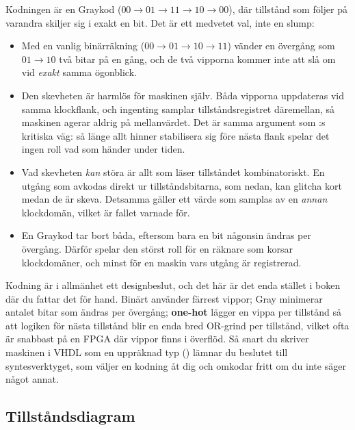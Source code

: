 Kodningen är en Graykod ($00 \to 01 \to 11 \to 10 \to 00$), där tillstånd som följer på varandra
skiljer sig i exakt en bit. Det är ett medvetet val, inte en slump:
\begin{itemize}
  \item Med en vanlig binärräkning ($00 \to 01 \to 10 \to 11$) vänder en övergång som
    $01 \to 10$ två bitar på en gång, och de två vipporna kommer inte att slå om vid \emph{exakt}
    samma ögonblick.
  \item Den skevheten är harmlös för maskinen själv. Båda vipporna uppdateras vid samma klockflank,
    och ingenting samplar tillståndsregistret däremellan, så maskinen agerar aldrig på
    mellanvärdet. Det är samma argument som :s kritiska väg: så länge allt
    hinner stabilisera sig före nästa flank spelar det ingen roll vad som händer under tiden.
  \item Vad skevheten \emph{kan} störa är allt som läser tillståndet kombinatoriskt. En utgång som
    avkodas direkt ur tillståndsbitarna, som  nedan, kan glitcha kort medan de är skeva.
    Detsamma gäller ett värde som samplas av en \emph{annan} klockdomän, vilket är fallet
     varnade för.
  \item En Graykod tar bort båda, eftersom bara en bit någonsin ändras per övergång. Därför spelar
    den störst roll för en räknare som korsar klockdomäner, och minst för en maskin vars utgång är
    registrerad.
\end{itemize}

Kodning är i allmänhet ett designbeslut, och det här är det enda stället i boken där du fattar det
för hand. Binärt använder färrest vippor; Gray minimerar antalet bitar som ändras per övergång;
\textbf{one-hot} lägger en vippa per tillstånd så att logiken för nästa tillstånd blir en enda bred
OR-grind per tillstånd, vilket ofta är snabbast på en FPGA där vippor finns i överflöd. Så snart du
skriver maskinen i VHDL som en uppräknad typ () lämnar du beslutet till
syntesverktyget, som väljer en kodning åt dig och omkodar fritt om du inte säger något annat.

\subsection*{Tillståndsdiagram}


